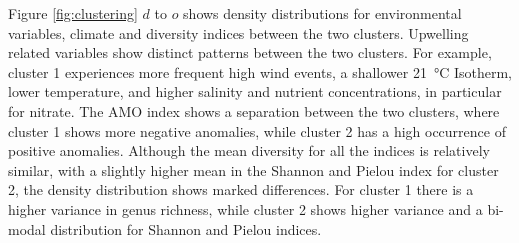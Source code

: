 \documentclass[draft]{agujournal2019}
\begin{document}
Figure \ref{fig:clustering} $d$ to $o$ shows density distributions for environmental variables, climate and diversity indices between the two clusters. Upwelling related variables show distinct patterns between the two clusters. For example, cluster 1 experiences more frequent high wind events, a shallower \qty{21}{\celsius} Isotherm, lower temperature, and higher salinity and nutrient concentrations, in particular for nitrate. The AMO index shows a separation between the two clusters, where cluster 1 shows more negative anomalies, while cluster 2 has a high occurrence of positive anomalies. Although the mean diversity for all the indices is relatively similar, with a slightly higher mean in the Shannon and Pielou index for cluster 2, the density distribution shows marked differences. For cluster 1 there is a higher variance in genus richness, while cluster 2 shows higher variance and a bi-modal distribution for Shannon and Pielou indices. 
\end{document}
